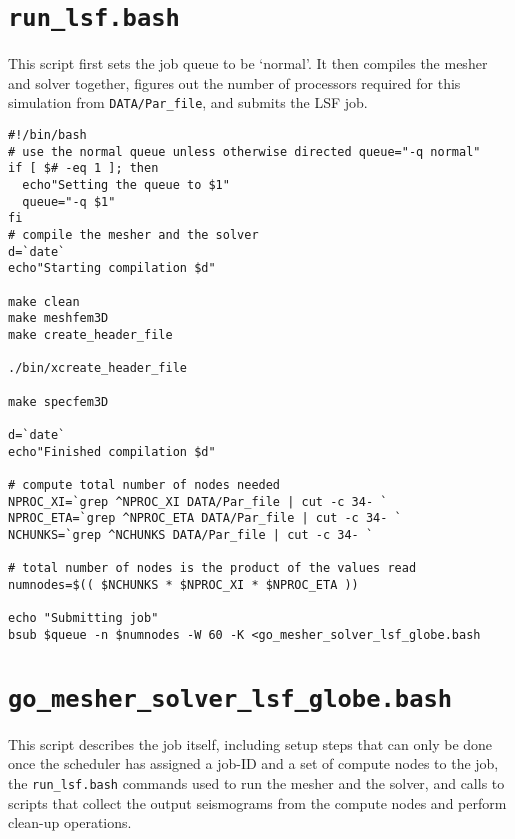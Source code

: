 \section{\texttt{run\_lsf.bash}}

This script first sets the job queue to be `normal'. It then compiles
the mesher and solver together, figures out the number of processors
required for this simulation from \texttt{DATA/Par\_file}, and submits
the LSF job.
{\small
\begin{verbatim}
#!/bin/bash
# use the normal queue unless otherwise directed queue="-q normal"
if [ $# -eq 1 ]; then
  echo"Setting the queue to $1"
  queue="-q $1"
fi
# compile the mesher and the solver
d=`date` 
echo"Starting compilation $d"

make clean
make meshfem3D
make create_header_file

./bin/xcreate_header_file

make specfem3D

d=`date`
echo"Finished compilation $d"

# compute total number of nodes needed
NPROC_XI=`grep ^NPROC_XI DATA/Par_file | cut -c 34- `
NPROC_ETA=`grep ^NPROC_ETA DATA/Par_file | cut -c 34- `
NCHUNKS=`grep ^NCHUNKS DATA/Par_file | cut -c 34- `

# total number of nodes is the product of the values read
numnodes=$(( $NCHUNKS * $NPROC_XI * $NPROC_ETA ))

echo "Submitting job"
bsub $queue -n $numnodes -W 60 -K <go_mesher_solver_lsf_globe.bash
\end{verbatim}
}

\section{\texttt{go\_mesher\_solver\_lsf\_globe.bash}}

This script describes the job itself, including setup steps that can
only be done once the scheduler has assigned a job-ID and a set of
compute nodes to the job, the \texttt{run\_lsf.bash} commands used
to run the mesher and the solver, and calls to scripts that collect
the output seismograms from the compute nodes and perform clean-up
operations.

